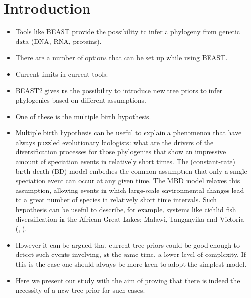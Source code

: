 \documentclass{article}
\begin{document}
\section{Introduction}
\begin{itemize}

\item Tools like BEAST provide the possibility to infer a phylogeny from genetic data (DNA, RNA, proteins).

\item There are a number of options that can be set up while using BEAST.

\item Current limits in current tools.

\item BEAST2 gives us the possibility to introduce new tree priors to infer phylogenies based on different assumptions.

\item One of these is the multiple birth hypothesis.

\item Multiple birth hypothesis can be useful to explain a phenomenon that have always puzzled evolutionary biologists: what are the drivers of the diversification processes for those phylogenies that show an impressive amount of speciation events in relatively short times.
The (constant-rate) birth-death (BD) model embodies the common assumption that 
only a single speciation event can occur at any given time.
The MBD model relaxes this assumption, allowing events in which 
large-scale environmental changes lead to a great number of species 
in relatively short time intervals. Such hypothesis can be useful to describe, for example, 
systems like cichlid fish diversification in the 
African Great Lakes: Malawi, Tanganyika and Victoria (\cite{janzen2016}, \cite{janzen2017}).

\item However it can be argued that current tree priors could be good enough to detect such events involving, at the same time, a lower level of complexity. If this is the case one should always be more keen to adopt the simplest model.

\item Here we present our study with the aim of proving that there is indeed the necessity of a new tree prior for such cases.

\end{itemize}
\end{document}
